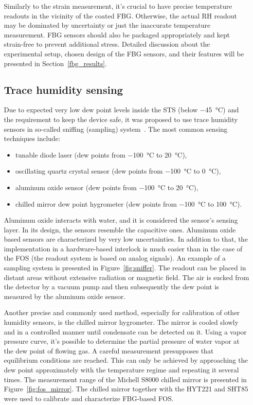 Similarly to the strain measurement, it’s crucial to have precise temperature readouts in the vicinity of the coated \gls{FBG}. Otherwise, the actual RH readout may be dominated by uncertainty or just the inaccurate temperature measurement. \gls{FBG} sensors should also be packaged appropriately and kept strain-free to prevent additional stress. Detailed discussion about the experimental setup, chosen design of the \gls{FBG} sensors, and their features will be presented in Section~\ref{fbg_results}.



\subsection{Trace humidity sensing}

Due to expected very low dew point levels inside the \gls{STS} (below \SI{-45}{\celsius}) and the requirement to keep the device safe, it was proposed to use trace humidity sensors in so-called sniffing (sampling) system~\cite{Berruti}. The most common sensing techniques include:
\begin{itemize}
    \item tunable diode laser (dew points from \SI{-100}{\celsius} to \SI{20}{\celsius}),
    \item oscillating quartz crystal sensor (dew points from \SI{-100}{\celsius} to \SI{0}{\celsius}),
    \item aluminum oxide sensor (dew points from \SI{-100}{\celsius} to \SI{20}{\celsius}),
    \item chilled mirror dew point hygrometer  (dew points from \SI{-100}{\celsius} to \SI{100}{\celsius}).
\end{itemize}

Aluminum oxide interacts with water, and it is considered the sensor's sensing layer. In its design, the sensors resemble the capacitive ones. Aluminum oxide based sensors are characterized by very low uncertainties. In addition to that, the implementation in a hardware-based interlock is much easier than in the case of the \gls{FOS} (the readout system is based on analog signals). An example of a sampling system is presented in Figure~\ref{fig:sniffer}. The readout can be placed in distant areas without extensive radiation or magnetic field. The air is sucked from the detector by a vacuum pump and then subsequently the dew point is measured by the aluminum oxide sensor.  

Another precise and commonly used method, especially for calibration of other humidity sensors, is the chilled mirror hygrometer. The mirror is cooled slowly and in a controlled manner until condensate can be detected on it. Using a vapor pressure curve, it's possible to determine the partial pressure of water vapor at the dew point of flowing gas. A careful measurement presupposes that equilibrium conditions are reached. This can only be achieved by approaching the dew point approximately with the temperature regime and repeating it several times. The measurement range of the Michell S8000 chilled mirror is presented in Figure~\ref{fig:fos_mirror}. The chilled mirror together with the HYT221 and SHT85 were used to calibrate and characterize FBG-based \gls{FOS}. 



